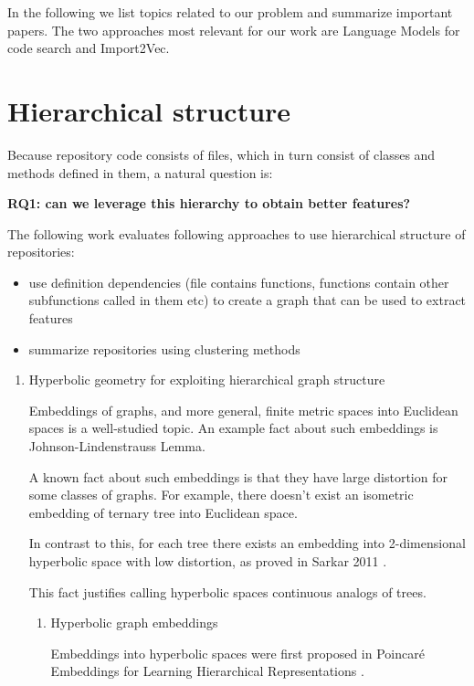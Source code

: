 \documentclass[11pt]{report}
\begin{document}
In the following we list topics related to our problem and summarize important papers.
The two approaches most relevant for our work are Language Models for code search and Import2Vec.

{\color{red}
\section{Hierarchical structure}

Because repository code consists of files, which in turn consist of classes and methods defined in them, a natural question is:

\textbf{\textbf{RQ1: can we leverage this hierarchy to obtain better features?}}

The following work evaluates following approaches to use hierarchical structure of repositories:

\begin{itemize}
\item use definition dependencies (file contains functions, functions contain other subfunctions called in them etc) to create a graph that can be used to extract features
\item summarize repositories using clustering methods
\end{itemize}


\begin{enumerate}
\item Hyperbolic geometry for exploiting hierarchical graph structure


Embeddings of graphs, and more general, finite metric spaces into Euclidean spaces is a well-studied topic.
An example fact about such embeddings is Johnson-Lindenstrauss Lemma.

A known fact about such embeddings is that they have large distortion for some classes of graphs. For example, there doesn't exist an isometric embedding of ternary tree into Euclidean space.

In contrast to this, for each tree there exists an embedding into 2-dimensional hyperbolic space with low distortion, as proved in Sarkar 2011 \cite{sarkar}.

This fact justifies calling hyperbolic spaces continuous analogs of trees.

\begin{enumerate}
\item Hyperbolic graph embeddings

     Embeddings into hyperbolic spaces were first proposed in Poincaré Embeddings for
Learning Hierarchical Representations \cite{poincare}.


\end{enumerate}
\end{enumerate}}
\end{document}
